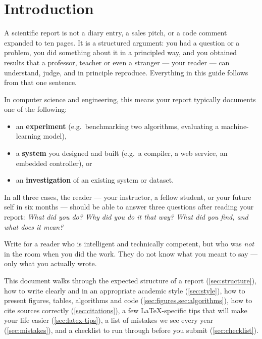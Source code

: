 \section{Introduction}
\label{sec:introduction}

A scientific report is not a diary entry, a sales pitch, or a code
comment expanded to ten pages. It is a structured argument: you had a
question or a problem, you did something about it in a principled way,
and you obtained results that a professor, teacher or even a stranger --- your reader --- can
understand, judge, and in principle reproduce. Everything in this guide
follows from that one sentence.

In computer science and engineering, this means your report typically
documents one of the following:
\begin{itemize}[nosep]
      \item an \textbf{experiment} (e.g.\ benchmarking two algorithms, evaluating
            a machine-learning model),
      \item a \textbf{system} you designed and built (e.g.\ a compiler, a web
            service, an embedded controller), or
      \item an \textbf{investigation} of an existing system or dataset.
\end{itemize}
In all three cases, the reader --- your instructor, a fellow student, or
your future self in six months --- should be able to answer three
questions after reading your report: \emph{What did you do? Why did you
do it that way? What did you find, and what does it mean?}

\begin{tipbox}
      Write for a reader who is intelligent and technically competent, but who
      was \emph{not} in the room when you did the work. They do not know what
      you meant to say --- only what you actually wrote.
\end{tipbox}

This document walks through the expected structure of a report
(\cref{sec:structure}), how to write clearly and in an appropriate
academic style (\cref{sec:style}), how to present figures, tables,
algorithms and code (\cref{sec:figures,sec:algorithms}), how to cite
sources correctly (\cref{sec:citations}), a few \LaTeX{}-specific tips
that will make your life easier (\cref{sec:latex-tips}), a list of
mistakes we see every year (\cref{sec:mistakes}), and a checklist to run
through before you submit (\cref{sec:checklist}).
